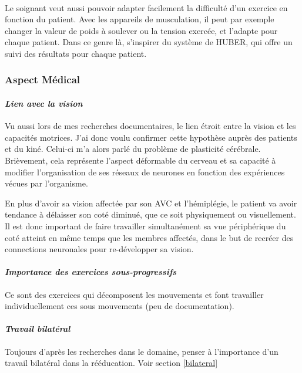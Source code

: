 \paragraph{}Le soignant veut aussi pouvoir adapter facilement la difficulté d'un exercice en fonction du patient. Avec les appareils de musculation, il peut par exemple changer la valeur de poids à soulever ou la tension exercée, et l'adapte pour chaque patient.
Dans ce genre là, s'inspirer du système de HUBER, qui offre un suivi des résultats pour chaque patient.

	\subsubsection*{Aspect Médical}

		\paragraph{\emph{Lien avec la vision}\\}
Vu aussi lors de mes recherches documentaires, le lien étroit entre la vision et les capacités motrices. J'ai donc voulu confirmer cette hypothèse auprès des patients et du kiné. Celui-ci m'a alors parlé du problème de plasticité cérébrale. Brièvement, cela représente l'aspect déformable du cerveau et sa capacité à modifier l'organisation de ses réseaux de neurones en fonction des expériences vécues par l'organisme. 

En plus d'avoir sa vision affectée par son AVC et l'hémiplégie, le patient va avoir tendance à délaisser son coté diminué, que ce soit physiquement ou visuellement. Il est donc important de faire travailler simultanément sa vue périphérique du coté atteint en même temps que les membres affectés, dans le but de recréer des connections neuronales pour re-développer sa vision.

		\paragraph{\emph{Importance des exercices sous-progressifs}\\}
Ce sont des exercices qui décomposent les mouvements et font travailler individuellement ces sous mouvements (peu de documentation).

		\paragraph{\emph{Travail bilatéral}\\}
Toujours d'après les recherches dans le domaine, penser à l'importance d'un travail bilatéral dans la rééducation. Voir section \ref{bilateral}


